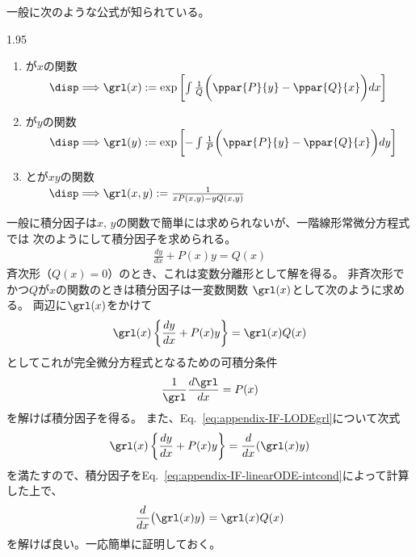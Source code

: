 一般に次のような公式が知られている。
\begin{spacing}{1.95}
  \begin{enumerate}[label=\textbf{\arabic*.}\hspace*{3pt}]
    \item {}が$x$の関数 \\
    $\qquad\disp\Longrightarrow \grl(x) := \exp \left[ \int\frac{1}{Q}\biggl(\ppar{P}{y} - \ppar{Q}{x}\biggr)dx\right]$
    \item {}が$y$の関数 \\
    $\qquad\disp\Longrightarrow \grl(y) := \exp \left[-\int\frac{1}{P}\biggl(\ppar{P}{y} - \ppar{Q}{x}\biggr)dy\right]$
    \item {}とが$xy$の関数 \\
    $\qquad\disp\Longrightarrow \grl(x,y) := \frac{1}{xP(x,y) - yQ(x,y)}$
  \end{enumerate}
\end{spacing}

一般に積分因子は$x,\,y$の関数で簡単には求められないが、一階線形常微分方程式では
次のようにして積分因子を求められる。
\begin{gather}
  \frac{dy}{dx} + P(x)y = Q(x) \label{eq:appendix-IF-linearODE}
\end{gather}
斉次形（$Q(x) = 0$）のとき、これは変数分離形として解を得る。
非斉次形でかつ$Q$が$x$の関数のときは積分因子は一変数関数
$\grl(x)$として次のように求める。
両辺に$\grl(x)$をかけて
\begin{gather}
  \grl(x)\left\{ \frac{dy}{dx} + P(x)y \right\} = \grl(x)Q(x) \label{eq:appendix-IF-LODEgrl}
\end{gather}
としてこれが完全微分方程式となるための可積分条件
\begin{gather}
  \frac{1}{\grl}\frac{d\grl}{dx} = P(x) \label{eq:appendix-IF-linearODE-intcond}
\end{gather}
を解けば積分因子を得る。
また、Eq.~\eqref{eq:appendix-IF-LODEgrl}について次式
\begin{gather}
  \grl(x)\left\{ \frac{dy}{dx} + P(x)y \right\} = \frac{d}{dx}(\grl(x)y) \label{eq:appendix-IF-LHScond}
\end{gather}
を満たすので、積分因子をEq.~\eqref{eq:appendix-IF-linearODE-intcond}によって計算した上で、
\begin{gather}
  \frac{d}{dx}\bigl(\grl(x)y\bigr) = \grl(x)Q(x)
\end{gather}
を解けば良い。一応簡単に証明しておく。

